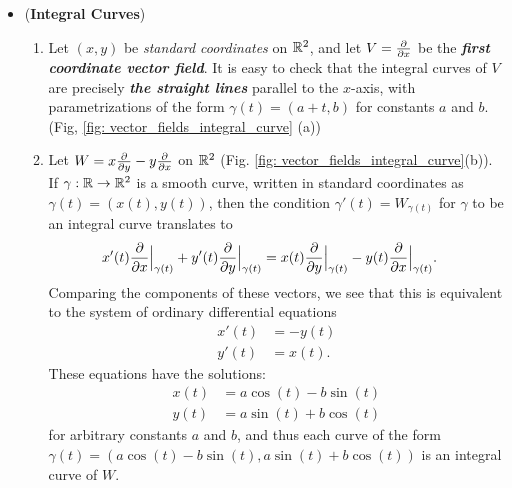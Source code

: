\documentclass[11pt]{article}
\begin{document}
\begin{itemize}
\item \begin{example} (\textbf{Integral Curves})
\begin{enumerate}
\item Let $(x, y)$ be \emph{standard coordinates} on ${\mathbb R}^2$, and let $V = \frac{\partial }{ \partial x}$ be the \emph{\textbf{first coordinate vector field}}. It is easy to check that the integral curves of $V$ are precisely \emph{\textbf{the straight lines}} parallel to the $x$-axis, with parametrizations of the form $\gamma(t) = (a + t, b)$ for constants $a$ and $b$. (Fig, \ref{fig: vector_fields_integral_curve} (a))

\item Let $W = x \frac{\partial }{ \partial y} - y \frac{\partial }{ \partial x}$ on ${\mathbb R}^2$ (Fig. \ref{fig: vector_fields_integral_curve}(b)). If $\gamma: {\mathbb R} \rightarrow {\mathbb R}^2$ is a smooth curve, written in standard coordinates as $\gamma(t) = (x(t), y(t))$,  then the condition $\gamma'(t) = W_{\gamma(t)}$ for $\gamma$ to be an integral curve translates to
\begin{align*}
x'(t) \frac{\partial }{ \partial x}\Bigr|_{\gamma(t)} + y'(t) \frac{\partial }{ \partial y}\Bigr|_{\gamma(t)} &=  x(t) \frac{\partial }{ \partial y}\Bigr|_{\gamma(t)} - y(t) \frac{\partial }{ \partial x}\Bigr|_{\gamma(t)}.
\end{align*} Comparing the components of these vectors, we see that this is equivalent to the system of ordinary differential equations
\begin{align*}
x'(t) &= - y(t) \\
y'(t) &=  x(t).
\end{align*} These equations have the solutions:
\begin{align*}
x(t)&= a\cos(t) -  b\sin(t) \\
y(t)&= a\sin(t) + b\cos(t)
\end{align*} for arbitrary constants $a$ and $b$, and thus each curve of the form $\gamma(t) = (a\cos(t) - b \sin(t), a \sin(t) + b \cos(t))$ is an integral curve of $W$. 
\end{enumerate}
\end{example}


\end{itemize}
\end{document}
